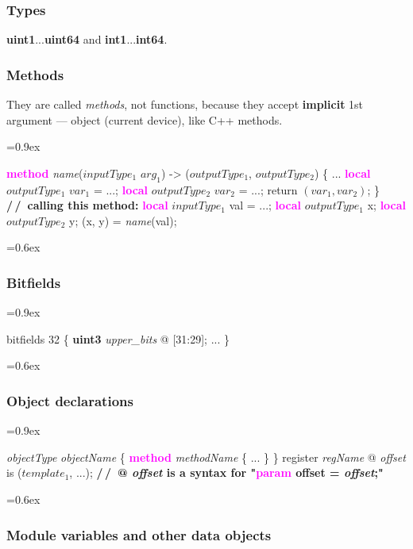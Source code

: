 \documentclass[8pt]{extarticle}
\newcommand{\vshort}[1]{%
\vspace{-0.6em}%
#1%
\vspace{-0.3em}}
\newcommand{\vshort}[1]{%
#1%
}
\newenvironment{code}[1][]{%
\begin{prebox}[#1]\obeylines%
\fontdimen2\font=0.9ex%
}{%
\end{prebox}%
\fontdimen2\font=0.6ex%
}
\newcommand{\ind}{\hphantom{~~~}}
\newcommand{\kw}[1]{\textcolor{magenta}{\textbf{#1}}}
\newcommand{\ty}[1]{\textcolor{myOrange}{\textbf{#1}}}
\newcommand{\cmtcommon}[1]{\textcolor{Sepia}{\textbf{#1}}}
\newcommand{\cmtd}[1]{\cmtcommon{/\,/\ #1}}
\newcommand{\p}[1]{\textit{\large#1}}
\begin{document}
\begin{multicols*}{3}
    \subsubsection{Types}
    \ty{uint1}...\ty{uint64} and \ty{int1}...\ty{int64}.

    \subsubsection{Methods}
    They are called \textit{methods}, not functions, because
    they accept \textbf{implicit} 1st argument — object (current
    device), like C++ methods.
    \begin{code}
        \kw{method} \p{name}(\ty{$inputType_1$} $arg_1$) -> (\ty{$outputType_1$}, \ty{$outputType_2$}) \{
            \vshort{\ind ...}
            \ind \kw{local} \ty{$outputType_1$} $var_1$ = ...; \kw{local} \ty{$outputType_2$} $var_2$ = ...;
            \ind return $(var_1, var_2)$;
        \}
        \cmtd{calling this method:}
        \kw{local} \ty{$inputType_1$} val = ...;
        \kw{local} \ty{$outputType_1$} x; \kw{local} \ty{$outputType_2$} y;
        (x, y) = \p{name}(val);
    \end{code}

    \subsubsection{Bitfields}
    \begin{code}
        bitfields 32 \{
            \ind \ty{uint3} \p{upper_bits} @ [31:29];
            \vshort{\ind ...}
        \}
    \end{code}

    \subsubsection{Object declarations}
    \begin{code}
        \p{objectType} \p{objectName} \{
            \ind \kw{method} \p{methodName} \{
            \ind     \vshort{\ind \ind ...}
            \ind \}
        \}
        register \p{regName} @ \p{offset} is ($template_1$, ...);
        \cmtd{@ \p{offset} is a syntax for "\kw{param} offset = \p{offset};"}
    \end{code}

\subsubsection{Module variables and other data objects}


\end{multicols*}
\end{document}
